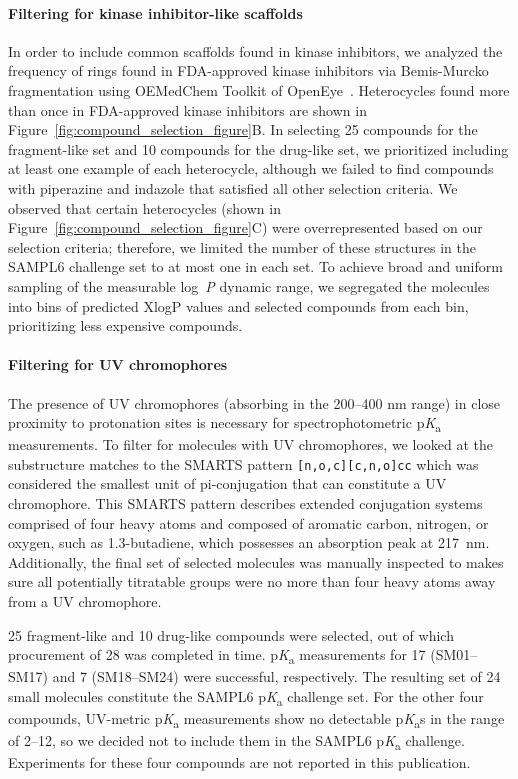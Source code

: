 \documentclass[9pt,lineno]{elife}
\newcommand{\pKa}{p\textit{K}\textsubscript{a}}
\newcommand{\logP}{log~\textit{P}}
\begin{document}
\paragraph{Filtering for kinase inhibitor-like scaffolds}

In order to include common scaffolds found in kinase inhibitors, we analyzed the frequency of rings found in FDA-approved kinase inhibitors via Bemis-Murcko fragmentation using OEMedChem Toolkit of OpenEye~\citep{bemis_properties_1996, oemedchemtk_openeye_2017}. Heterocycles found more than once in FDA-approved kinase inhibitors are shown in Figure~\ref{fig:compound_selection_figure}B. 
In selecting 25 compounds for the fragment-like set and 10 compounds for the drug-like set, we prioritized including at least one example of each heterocycle, although we failed to find compounds with piperazine and indazole that satisfied all other selection criteria. 
We observed that certain heterocycles (shown in Figure~\ref{fig:compound_selection_figure}C) were overrepresented based on our selection criteria; therefore, we limited the number of these structures in the SAMPL6 challenge set to at most one in each set.
To achieve broad and uniform sampling of the measurable \logP{} dynamic range, we segregated the molecules into bins of predicted XlogP values and selected compounds from each bin, prioritizing less expensive compounds. 

\paragraph{Filtering for UV chromophores}

The presence of UV chromophores (absorbing in the 200--400 nm range) in close proximity to protonation sites is necessary for spectrophotometric \pKa{} measurements. 
To filter for molecules with UV chromophores, we looked at the substructure matches to the SMARTS pattern \texttt{[n,o,c][c,n,o]cc} which was considered the smallest unit of pi-conjugation that can constitute a UV chromophore. 
This SMARTS pattern describes extended conjugation systems comprised of four heavy atoms and composed of aromatic carbon, nitrogen, or oxygen, such as 1.3-butadiene, which possesses an absorption peak at 217~nm. 
Additionally, the final set of selected molecules was manually inspected to makes sure all potentially titratable groups were no more than four heavy atoms away from a UV chromophore.

25 fragment-like and 10 drug-like compounds were selected, out of which procurement of 28 was completed in time. \pKa{} measurements for 17 (SM01--SM17) and 7 (SM18--SM24) were successful, respectively. 
The resulting set of 24 small molecules constitute the SAMPL6 \pKa{} challenge set.
For the other four compounds, UV-metric \pKa{} measurements show no detectable \pKa{}s in the range of 2--12, so we decided not to include them in the SAMPL6 \pKa{} challenge. 
Experiments for these four compounds are not reported in this publication. 
\end{document}
